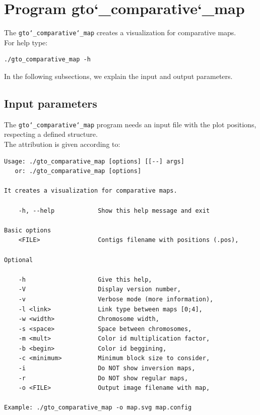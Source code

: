 \section{Program gto\char`_comparative\char`_map}
The \texttt{gto\char`_comparative\char`_map} creates a visualization for comparative maps.\\
For help type:
\begin{lstlisting}
./gto_comparative_map -h
\end{lstlisting}
In the following subsections, we explain the input and output parameters.

\subsection*{Input parameters}

The \texttt{gto\char`_comparative\char`_map} program needs an input file with the plot positions, respecting a defined structure.\\
The attribution is given according to:
\begin{lstlisting}
Usage: ./gto_comparative_map [options] [[--] args]                        
   or: ./gto_comparative_map [options]                                    
                                                                          
It creates a visualization for comparative maps.                          
                                                                          
    -h, --help            Show this help message and exit                 
                                                                          
Basic options                                                             
    <FILE>                Contigs filename with positions (.pos),         
                                                                          
Optional                                                                  
                                                                          
    -h                    Give this help,                                 
    -V                    Display version number,                         
    -v                    Verbose mode (more information),                
    -l <link>             Link type between maps [0;4],                   
    -w <width>            Chromosome width,                               
    -s <space>            Space between chromosomes,                      
    -m <mult>             Color id multiplication factor,                 
    -b <begin>            Color id beggining,                             
    -c <minimum>          Minimum block size to consider,                 
    -i                    Do NOT show inversion maps,                     
    -r                    Do NOT show regular maps,                       
    -o <FILE>             Output image filename with map,                 
                                                                          
Example: ./gto_comparative_map -o map.svg map.config 
\end{lstlisting}
